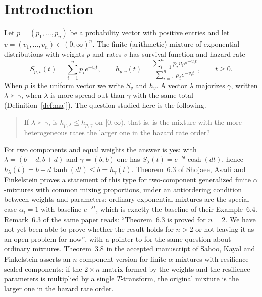 \documentclass[10pt]{article}
\theoremstyle{plain}
\theoremstyle{definition}
\theoremstyle{remark}
\begin{document}
\begin{abstract}
\medskip\noindent\textbf{Keywords.} finite mixture; hazard rate order; majorization; $T$-transform; exponential distribution; counterexample.

\noindent\textbf{MSC 2020.} 60E15; 62N05; 90B25.
\end{abstract}

\section{Introduction}\label{sec:intro}

Let $p=(p_1,\dots,p_n)$ be a probability vector with positive entries and let $v=(v_1,\dots,v_n)\in(0,\infty)^n$. The finite (arithmetic) mixture of exponential distributions with weights $p$ and rates $v$ has survival function and hazard rate
\begin{equation}\label{eq:mixture}
S_{p,v}(t)=\sum_{i=1}^n p_i e^{-v_i t},\qquad
h_{p,v}(t)=\frac{\sum_{i=1}^n p_i v_i e^{-v_i t}}{\sum_{i=1}^n p_i e^{-v_i t}},\qquad t\ge 0 .
\end{equation}
When $p$ is the uniform vector we write $S_v$ and $h_v$. A vector $\lambda$ majorizes $\gamma$, written $\lambda\succ\gamma$, when $\lambda$ is more spread out than $\gamma$ with the same total (Definition~\ref{def:maj}). The question studied here is the following.

\begin{quote}
If $\lambda\succ\gamma$, is $h_{p,\lambda}\le h_{p,\gamma}$ on $[0,\infty)$, that is, is the mixture with the more heterogeneous rates the larger one in the hazard rate order?
\end{quote}

For two components and equal weights the answer is yes: with $\lambda=(b-d,b+d)$ and $\gamma=(b,b)$ one has $S_\lambda(t)=e^{-bt}\cosh(dt)$, hence $h_\lambda(t)=b-d\tanh(dt)\le b=h_\gamma(t)$. Theorem~6.3 of Shojaee, Asadi and Finkelstein \cite{ShojaeeAsadiFinkelstein2022} proves a statement of this type for two-component generalized finite $\alpha$-mixtures with common mixing proportions, under an antiordering condition between weights and parameters; ordinary exponential mixtures are the special case $\alpha_i=1$ with baseline $e^{-\lambda t}$, which is exactly the baseline of their Example~6.4. Remark~6.3 of the same paper reads: ``Theorem~6.3 is proved for $n=2$. We have not yet been able to prove whether the result holds for $n>2$ or not leaving it as an open problem for now'', with a pointer to \cite{HazraFinkelstein2018,NadebTorabi2022} for the same question about ordinary mixtures. Theorem~3.8 in the accepted manuscript of Sahoo, Kayal and Finkelstein \cite{SahooKayalFinkelstein2026} asserts an $n$-component version for finite $\alpha$-mixtures with resilience-scaled components: if the $2\times n$ matrix formed by the weights and the resilience parameters is multiplied by a single $T$-transform, the original mixture is the larger one in the hazard rate order.
\end{document}
